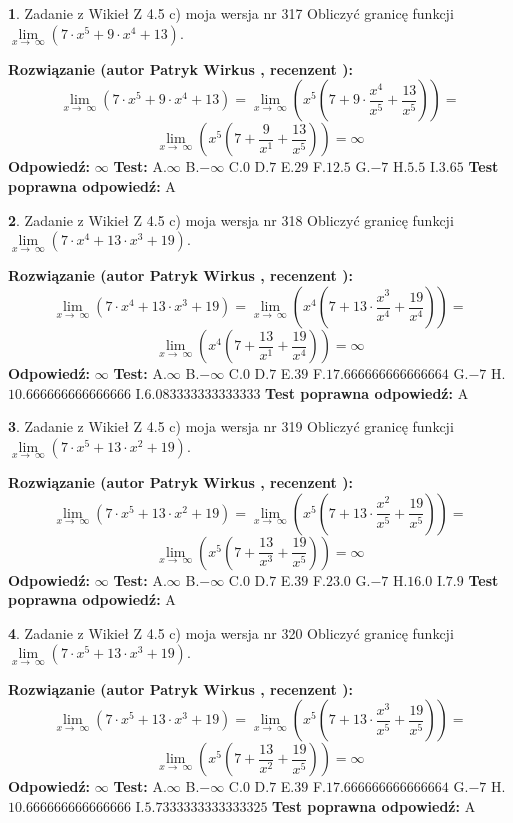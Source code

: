 \documentclass[12pt, a4paper]{article}
\theoremstyle{definition} %
\newtheorem{zad}{}
\newcommand{\zadStart}[1]{\begin{zad}#1\newline}
\newcommand{\zadStop}{\end{zad}}
\newcommand{\rozwStart}[2]{\noindent \textbf{Rozwiązanie (autor #1 , recenzent #2): }\newline}
\newcommand{\rozwStop}{\newline}
\newcommand{\odpStart}{\noindent \textbf{Odpowiedź:}\newline}
\newcommand{\odpStop}{\newline}
\newcommand{\testStart}{\noindent \textbf{Test:}\newline}
\newcommand{\testStop}{\newline}
\newcommand{\kluczStart}{\noindent \textbf{Test poprawna odpowiedź:}\newline}
\newcommand{\kluczStop}{\newline}
\begin{document}
\zadStart{Zadanie z Wikieł Z 4.5 c) moja wersja nr 317}
Obliczyć granicę funkcji  $\lim\limits_{x\to\ \infty}(7 \cdot x^{5}+9 \cdot x^{4}+13)$.
\zadStop
\rozwStart{Patryk Wirkus}{}
$$\lim\limits_{x\to\ \infty}(7 \cdot x^{5}+9 \cdot x^{4}+13) = \lim\limits_{x\to\ \infty}(x^{5}(7 +9 \cdot \frac{x^{4}}{x^{5}}+\frac{13}{x^{5}})) =$$ $$\lim\limits_{x\to\ \infty}(x^{5}(7 +\frac{9}{x^{1}}+\frac{13}{x^{5}})) =\infty$$
\rozwStop
\odpStart
$\infty$
\odpStop
\testStart
A.$\infty$ B.$-\infty$ C.$0$ D.$7$ E.$29$
F.$12.5$ G.$-7$
H.$5.5$
I.$3.65$
\testStop
\kluczStart
A
\kluczStop



\zadStart{Zadanie z Wikieł Z 4.5 c) moja wersja nr 318}
Obliczyć granicę funkcji  $\lim\limits_{x\to\ \infty}(7 \cdot x^{4}+13 \cdot x^{3}+19)$.
\zadStop
\rozwStart{Patryk Wirkus}{}
$$\lim\limits_{x\to\ \infty}(7 \cdot x^{4}+13 \cdot x^{3}+19) = \lim\limits_{x\to\ \infty}(x^{4}(7 +13 \cdot \frac{x^{3}}{x^{4}}+\frac{19}{x^{4}})) =$$ $$\lim\limits_{x\to\ \infty}(x^{4}(7 +\frac{13}{x^{1}}+\frac{19}{x^{4}})) =\infty$$
\rozwStop
\odpStart
$\infty$
\odpStop
\testStart
A.$\infty$ B.$-\infty$ C.$0$ D.$7$ E.$39$
F.$17.666666666666664$ G.$-7$
H.$10.666666666666666$
I.$6.083333333333333$
\testStop
\kluczStart
A
\kluczStop



\zadStart{Zadanie z Wikieł Z 4.5 c) moja wersja nr 319}
Obliczyć granicę funkcji  $\lim\limits_{x\to\ \infty}(7 \cdot x^{5}+13 \cdot x^{2}+19)$.
\zadStop
\rozwStart{Patryk Wirkus}{}
$$\lim\limits_{x\to\ \infty}(7 \cdot x^{5}+13 \cdot x^{2}+19) = \lim\limits_{x\to\ \infty}(x^{5}(7 +13 \cdot \frac{x^{2}}{x^{5}}+\frac{19}{x^{5}})) =$$ $$\lim\limits_{x\to\ \infty}(x^{5}(7 +\frac{13}{x^{3}}+\frac{19}{x^{5}})) =\infty$$
\rozwStop
\odpStart
$\infty$
\odpStop
\testStart
A.$\infty$ B.$-\infty$ C.$0$ D.$7$ E.$39$
F.$23.0$ G.$-7$
H.$16.0$
I.$7.9$
\testStop
\kluczStart
A
\kluczStop



\zadStart{Zadanie z Wikieł Z 4.5 c) moja wersja nr 320}
Obliczyć granicę funkcji  $\lim\limits_{x\to\ \infty}(7 \cdot x^{5}+13 \cdot x^{3}+19)$.
\zadStop
\rozwStart{Patryk Wirkus}{}
$$\lim\limits_{x\to\ \infty}(7 \cdot x^{5}+13 \cdot x^{3}+19) = \lim\limits_{x\to\ \infty}(x^{5}(7 +13 \cdot \frac{x^{3}}{x^{5}}+\frac{19}{x^{5}})) =$$ $$\lim\limits_{x\to\ \infty}(x^{5}(7 +\frac{13}{x^{2}}+\frac{19}{x^{5}})) =\infty$$
\rozwStop
\odpStart
$\infty$
\odpStop
\testStart
A.$\infty$ B.$-\infty$ C.$0$ D.$7$ E.$39$
F.$17.666666666666664$ G.$-7$
H.$10.666666666666666$
I.$5.7333333333333325$
\testStop
\kluczStart
A
\kluczStop
\end{document}
